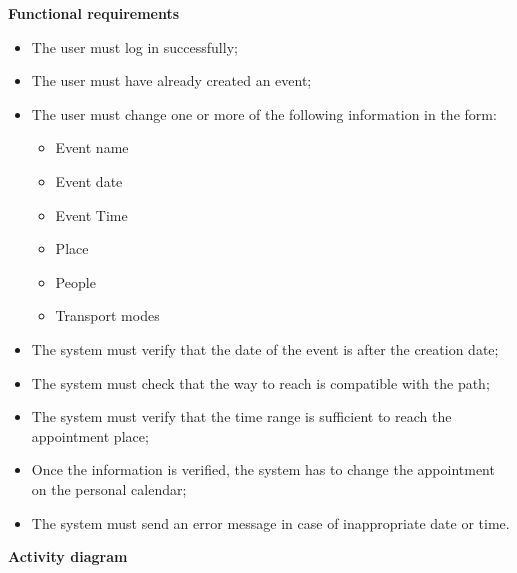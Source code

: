 \documentclass{article}
\begin{document}
	\newpage
	\noindent
	\textbf{Functional requirements} \\
	\begin{itemize}
		\item The user must log in successfully;
		\item The user must have already created an event;
		\item The user must change one or more of the following information in the form:
			\begin{itemize}
				\item Event name
				\item Event date
				\item Event Time
				\item Place
				\item People
				\item Transport modes
			\end{itemize}
		\item The system must verify that the date of the event is after the creation date;
		\item The system must check that the way to reach is compatible with the path;
		\item The system must verify that the time range is sufficient to reach the appointment place;
		\item Once the information is verified, the system has to change the appointment on the personal calendar;
		\item The system must send an error message in case of inappropriate date or time.
	\end{itemize}
	
	\newpage
	\noindent
	\textbf{Activity diagram} \\
	
\end{document}
